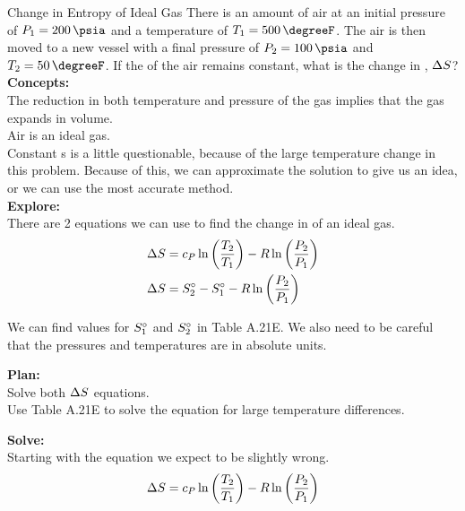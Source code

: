 \begin{example}{Change in Entropy of Ideal Gas}
  There is an amount of air at an initial pressure of $\Pressure_{1} = \SI{200}{\psia}$ and a temperature of $\Temp_{1} = \SI{500}{\degreeF}$.
  The air is then moved to a new vessel with a final pressure of $\Pressure_{2} = \SI{100}{\psia}$ and $\Temp_{2} = \SI{50}{\degreeF}$.
  If the  of the air remains constant, what is the change in , $\Delta S$?
  \tcblower{}
  \textbf{Concepts:} \\
  The reduction in both temperature and pressure of the gas implies that the gas expands in volume. \\
  Air is an ideal gas. \\
  Constant s is a little questionable, because of the large temperature change in this problem.
  Because of this, we can approximate the solution to give us an idea, or we can use the most accurate method. \\

  \textbf{Explore:} \\
  There are 2 equations we can use to find the change in  of an ideal gas.
  \begin{align*}
    \Delta S &= c_{P} \ln \left( \frac{T_{2}}{T_{1}} \right) - R \ln \left( \frac{P_{2}}{P_{1}} \right) \\
    \Delta S &= S_{2}^{\circ} - S_{1}^{\circ} - R \ln \left( \frac{P_{2}}{P_{1}} \right)
  \end{align*}

  We can find values for $S_{1}^{\circ}$ and $S_{2}^{\circ}$ in Table A.21E.
  We also need to be careful that the pressures and temperatures are in absolute units.

  \textbf{Plan:} \\
  Solve both $\Delta S$ equations. \\
  Use Table A.21E to solve the equation for large temperature differences.

  \textbf{Solve:} \\
  Starting with the equation we expect to be slightly wrong.
  \begin{equation*}
    \Delta S = c_{P} \ln \left( \frac{T_{2}}{T_{1}} \right) - R \ln \left( \frac{P_{2}}{P_{1}} \right)
  \end{equation*}


\end{example}
